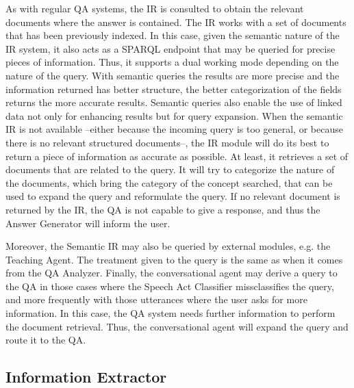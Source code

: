As with regular \ac{QA} systems, the \ac{IR} is consulted to obtain the relevant documents where the answer is contained. The \ac{IR} works with a set of documents that has been previously indexed.
In this case, given the semantic nature of the \ac{IR} system, it also acts as a SPARQL endpoint that may be queried for precise pieces of information. Thus, it supports a dual working mode depending on the nature of the query. 
With semantic queries the results are more precise and the information returned has better structure, the better categorization of the fields returns the more accurate results. 
Semantic queries also enable the use of linked data not only for enhancing results but for query expansion.
When the semantic IR is not available --either because the incoming query is too general, or because there is no relevant structured documents--, the IR module will do its best to return a piece of information as accurate as possible. At least, it retrieves a set of documents that are related to the query. It will try to categorize the nature of the documents, which bring the category of the concept searched, that can be used to expand the query and reformulate the query.
If no relevant document is returned by the \ac{IR}, the \ac{QA} is not capable to give a response, and thus the Answer Generator will inform the user. 

Moreover, the Semantic \ac{IR} may also be queried by external modules, e.g. the Teaching Agent. The treatment given to the query is the same as when it comes from the QA Analyzer.
Finally, the conversational agent may derive a query to the \ac{QA} in those cases where the Speech Act Classifier missclassifies the query, and more frequently with those utterances where the user	 asks for more information. In this case, the \ac{QA} system needs further information to perform the document retrieval. Thus, the conversational agent will expand the query and route it to the \ac{QA}.


\subsection{Information Extractor}


